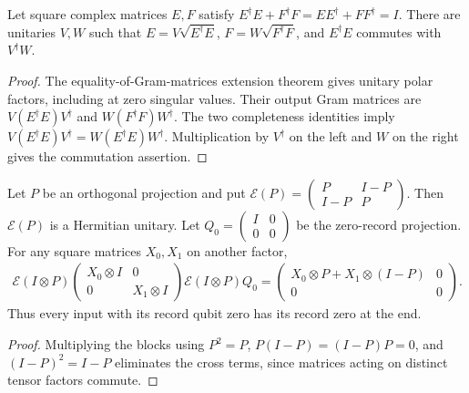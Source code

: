 \begin{lemma}
    \label{thm:mpu_two_kraus_polar}
    \leanok
    Let square complex matrices $E,F$ satisfy
    $E^\dagger E+F^\dagger F=EE^\dagger+FF^\dagger=I$.
    There are unitaries $V,W$ such that
    $E=V\sqrt{E^\dagger E}$, $F=W\sqrt{F^\dagger F}$, and
    $E^\dagger E$ commutes with $V^\dagger W$.
\end{lemma}
\begin{proof}\leanok
    The equality-of-Gram-matrices extension theorem gives unitary
    polar factors, including at zero singular values. Their output
    Gram matrices are $V(E^\dagger E)V^\dagger$ and
    $W(F^\dagger F)W^\dagger$. The two completeness identities imply
    $V(E^\dagger E)V^\dagger=W(E^\dagger E)W^\dagger$.
    Multiplication by $V^\dagger$ on the left and $W$ on the right
    gives the commutation assertion.
\end{proof}

\begin{lemma}
    \label{thm:mpu_two_sector_merging}
    \leanok
    Let $P$ be an orthogonal projection and put
    $\mathcal E(P)=\left(\begin{smallmatrix}P&I-P\\I-P&P\end{smallmatrix}\right)$.
    Then $\mathcal E(P)$ is a Hermitian unitary.
    Let $Q_0=\left(\begin{smallmatrix}I&0\\0&0\end{smallmatrix}\right)$
    be the zero-record projection. For any square matrices $X_0,X_1$
    on another factor,
    \begin{align}
        \mathcal E(I\otimes P)
        \begin{pmatrix}X_0\otimes I&0\\0&X_1\otimes I\end{pmatrix}
        \mathcal E(I\otimes P)Q_0
        =\begin{pmatrix}X_0\otimes P+X_1\otimes(I-P)&0\\0&0\end{pmatrix}.
    \end{align}
    Thus every input with its record qubit zero has its record zero
    at the end.
\end{lemma}
\begin{proof}\leanok
    Multiplying the blocks using $P^2=P$,
    $P(I-P)=(I-P)P=0$, and $(I-P)^2=I-P$ eliminates the cross terms, since
    matrices acting on distinct tensor factors commute.
\end{proof}

